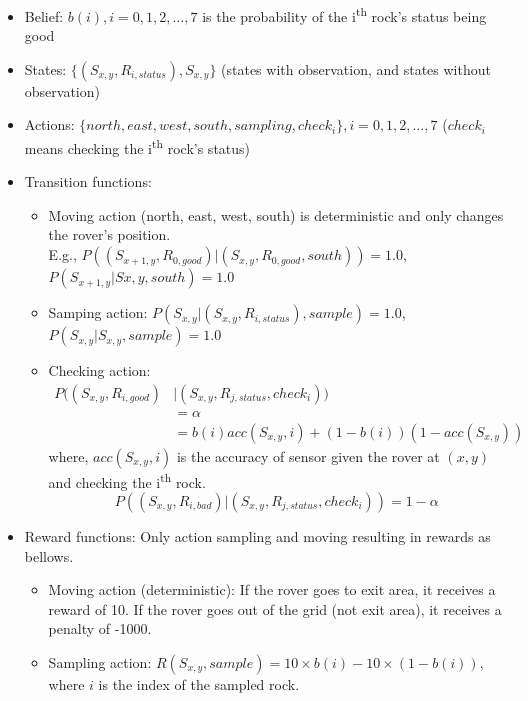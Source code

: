 \documentclass{article}
\begin{document}
\begin{itemize}

\item Belief: $b(i), i=0,1,2,\dots,7$ is the probability of the 
i\textsuperscript{th} rock's status being good

\item States: $\{(S_{x,y},R_{i,status}), S_{x,y}\}$ (states with observation, and 
states without observation)

\item Actions: $\{north, east, west, south, sampling, check_i\}, i=0,1,2,\dots,7$ 
($check_i$ means checking the i\textsuperscript{th} rock's status)

\item Transition functions:
	\begin{itemize}
	\item Moving action (north, east, west, south) is deterministic and only changes
	the rover's position.\\ 
	E.g., $P( (S_{x+1,y},R_{0,good}) | (S_{x,y},R_{0,good}, south) ) = 1.0$,\\
	$P( S_{x+1,y} | S{x,y}, south) = 1.0$
	\item Samping action: $P( S_{x,y} | (S_{x,y}, R_{i,status}), sample) = 1.0$,\\
	$P( S_{x,y} | S_{x,y}, sample) = 1.0$
	\item Checking action:\\
    \begin{equation*}
    	\begin{aligned}
	P( (S_{x,y}, R_{i,good}) &| (S_{x,y}, R_{j,status}, check_i) ) \\
		&= \alpha \\
		&= b(i)acc(S_{x,y}, i) + (1 - b(i))(1 - acc(S_{x,y}))
		\end{aligned}
    \end{equation*}
    where, $acc(S_{x,y},i)$ is the accuracy 
	of sensor given the rover at $(x,y)$ and checking the i\textsuperscript{th} rock.
	\begin{equation*}
		P( (S_{x,y}, R_{i,bad}) | (S_{x,y}, R_{j,status}, check_i) ) = 1 - \alpha
	\end{equation*}
	\end{itemize}

\item Reward functions: Only action sampling and moving resulting in rewards as bellows.
	\begin{itemize}
	\item Moving action (deterministic): If the rover goes to exit area, it receives a 
	reward of 10. If the rover goes out of the grid (not exit area), it receives a
	penalty of -1000.
	\item Sampling action: $R(S_{x,y}, sample) = 10 \times b(i) - 10 \times (1 - b(i))$,
	where $i$ is the index of the sampled rock.
	\end{itemize}

\end{itemize}
\end{document}

